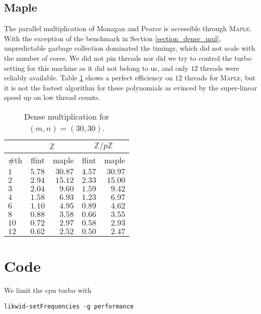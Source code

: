 \documentclass{deliverablereport}
\begin{document}
\subsection{Maple}
The parallel multiplication of Monagan and Pearce \cite{Monagan:2009:PSP:1576702.1576739} is accessible through \textsc{Maple}. With the exception of the benchmark in Section \ref{section_dense_mul}, unpredictable garbage collection dominated the timings, which did not scale with the number of cores. We did not pin threads nor did we try to control the turbo setting for this machine as it did not belong to us, and only $12$ threads were reliably available. Table \ref{table_maple} shows a perfect efficiency on $12$ threads for \textsc{Maple}, but it is not the fastest algorithm for these polynomials as evinced by the super-linear speed up on low thread counts.

\begin{table}
\begin{tabular}{l | r | r | r | r | }
 & \multicolumn{2}{|c|}{$\mathbb{Z}$} & \multicolumn{2}{|c|}{$\mathbb{Z}/p \mathbb{Z}$} \\ \hline
\#th   & flint & maple & flint & maple\\ \hline
$1$   & $5.78$ & $30.87$  &$4.57$ & $30.97$\\ \hline
$2$   & $2.94$ & $15.12$  &$2.33$ & $15.00$\\ \hline
$3$   & $2.04$ & $9.60$   &$1.59$ & $9.42$\\ \hline
$4$   & $1.58$ & $6.93$   &$1.23$ & $6.97$\\ \hline
$6$   & $1.10$ & $4.95$   &$0.89$ & $4.62$\\ \hline
$8$   & $0.88$ & $3.58$   &$0.66$ & $3.55$\\ \hline
$10$  & $0.72$ & $2.97$   &$0.58$ & $2.93$\\ \hline
$12$  & $0.62$ & $2.52$   &$0.50$ & $2.47$\\ \hline
\end{tabular}
\caption{Dense multiplication for $(m, n) = (30, 30)$.}
\label{table_maple}
\end{table}


\section{Code}
\label{section_code}

We limit the cpu turbo with
\begin{verbatim}
likwid-setFrequencies -g performance
\end{verbatim}
\end{document}
